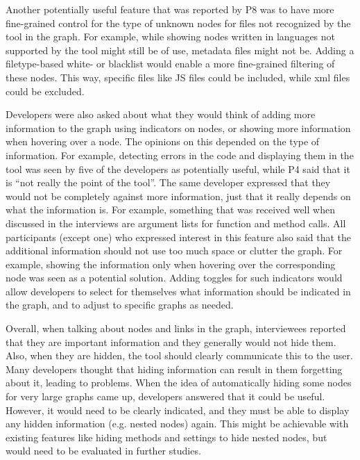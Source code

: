 \documentclass[a4paper,11pt,twoside]{article}
\theoremstyle{definition} %
\begin{document}
Another potentially useful feature that was reported by P8 was to have more fine-grained control for the type of unknown nodes for files not recognized by the tool in the graph. For example, while showing nodes written in languages not supported by the tool might still be of use, metadata files might not be. Adding a filetype-based white- or blacklist would enable a more fine-grained filtering of these nodes. This way, specific files like JS files could be included, while xml files could be excluded.

Developers were also asked about what they would think of adding more information to the graph using indicators on nodes, or showing more information when hovering over a node. The opinions on this depended on the type of information. For example, detecting errors in the code and displaying them in the tool was seen by five of the developers as potentially useful, while P4 said that it is “not really the point of the tool”. The same developer expressed that they would not be completely against more information, just that it really depends on what the information is. For example, something that was received well when discussed in the interviews are argument lists for function and method calls. All participants (except one) who expressed interest in this feature also said that the additional information should not use too much space or clutter the graph. For example, showing the information only when hovering over the corresponding node was seen as a potential solution. Adding toggles for such indicators would allow developers to select for themselves what information should be indicated in the graph, and to adjust to specific graphs as needed.

Overall, when talking about nodes and links in the graph, interviewees reported that they are important information and they generally would not hide them. Also, when they are hidden, the tool should clearly communicate this to the user. Many developers thought that hiding information can result in them forgetting about it, leading to problems. When the idea of automatically hiding some nodes for very large graphs came up, developers answered that it could be useful. However, it would need to be clearly indicated, and they must be able to display any hidden information (e.g. nested nodes) again. This might be achievable with existing features like hiding methods and settings to hide nested nodes, but would need to be evaluated in further studies. 
\end{document}
